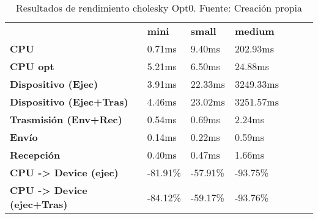 \begin{table}[H]
    \centering
    \begin{tabular}{lllllll}
    \rowcolor[HTML]{DAE8FC} \ &  \textbf{mini} &  \textbf{	small} &  \textbf{	medium} \\
    \cellcolor[HTML]{DAE8FC} \textbf{CPU} & 0.71ms & 	9.40ms & 	202.93ms \\
    \rowcolor[HTML]{EFEFEF} \cellcolor[HTML]{DAE8FC} \textbf{CPU opt} & 5.21ms & 	6.50ms & 	24.88ms \\
    \cellcolor[HTML]{DAE8FC} \textbf{Dispositivo (Ejec)} & 3.91ms & 	22.33ms & 	3249.33ms \\
    \rowcolor[HTML]{EFEFEF} \cellcolor[HTML]{DAE8FC} \textbf{Dispositivo (Ejec+Tras)} & 4.46ms & 	23.02ms & 	3251.57ms \\
    \cellcolor[HTML]{DAE8FC} \textbf{Trasmisión (Env+Rec)} & 0.54ms & 	0.69ms & 	2.24ms \\
    \rowcolor[HTML]{EFEFEF} \cellcolor[HTML]{DAE8FC} \textbf{Envío} & 0.14ms & 	0.22ms & 	0.59ms \\
    \cellcolor[HTML]{DAE8FC} \textbf{Recepción} & 0.40ms & 	0.47ms & 	1.66ms \\
    \rowcolor[HTML]{EFEFEF} \cellcolor[HTML]{DAE8FC} \textbf{CPU -> Device (ejec)} & -81.91\% & 	-57.91\% & 	-93.75\% \\
    \cellcolor[HTML]{DAE8FC} \textbf{CPU -> Device (ejec+Tras)} & -84.12\% & 	-59.17\% & 	-93.76\% \\
    \end{tabular}
    \caption[Resultados de rendimiento cholesky Opt0]{{Resultados de rendimiento cholesky Opt0. Fuente: Creación propia}}
    \label{table_test_cholesky_Opt0_hw_performanceResults}
\end{table}